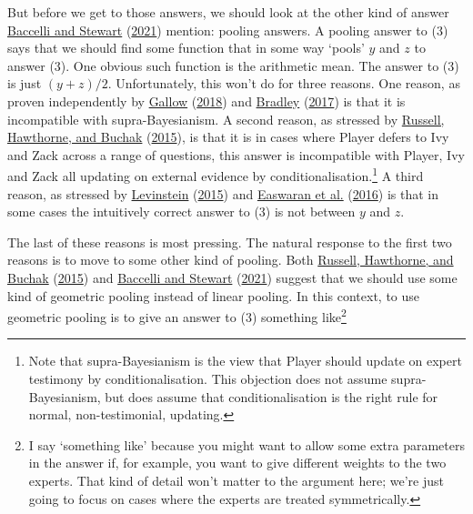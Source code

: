\documentclass[
  12pt,
]{article}
\begin{document}
But before we get to those answers, we should look at the other kind of
answer \protect\hyperlink{ref-BaccelliStewart2021}{Baccelli and Stewart}
(\protect\hyperlink{ref-BaccelliStewart2021}{2021}) mention: pooling
answers. A pooling answer to (3) says that we should find some function
that in some way `pools' \(y\) and \(z\) to answer (3). One obvious such
function is the arithmetic mean. The answer to (3) is just
\((y + z)/2\). Unfortunately, this won't do for three reasons. One
reason, as proven independently by
\protect\hyperlink{ref-Gallow2018}{Gallow}
(\protect\hyperlink{ref-Gallow2018}{2018}) and
\protect\hyperlink{ref-Bradley2017}{Bradley}
(\protect\hyperlink{ref-Bradley2017}{2017}) is that it is incompatible
with supra-Bayesianism. A second reason, as stressed by
\protect\hyperlink{ref-RussellEtAl2015}{Russell, Hawthorne, and Buchak}
(\protect\hyperlink{ref-RussellEtAl2015}{2015}), is that it is in cases
where Player defers to Ivy and Zack across a range of questions, this
answer is incompatible with Player, Ivy and Zack all updating on
external evidence by conditionalisation.\footnote{Note that
  supra-Bayesianism is the view that Player should update on expert
  testimony by conditionalisation. This objection does not assume
  supra-Bayesianism, but does assume that conditionalisation is the
  right rule for normal, non-testimonial, updating.} A third reason, as
stressed by \protect\hyperlink{ref-Levinstein2015}{Levinstein}
(\protect\hyperlink{ref-Levinstein2015}{2015}) and
\protect\hyperlink{ref-EaswaranEtAl2016}{Easwaran et al.}
(\protect\hyperlink{ref-EaswaranEtAl2016}{2016}) is that in some cases
the intuitively correct answer to (3) is not between \(y\) and \(z\).

The last of these reasons is most pressing. The natural response to the
first two reasons is to move to some other kind of pooling. Both
\protect\hyperlink{ref-RussellEtAl2015}{Russell, Hawthorne, and Buchak}
(\protect\hyperlink{ref-RussellEtAl2015}{2015}) and
\protect\hyperlink{ref-BaccelliStewart2021}{Baccelli and Stewart}
(\protect\hyperlink{ref-BaccelliStewart2021}{2021}) suggest that we
should use some kind of geometric pooling instead of linear pooling. In
this context, to use geometric pooling is to give an answer to (3)
something like\footnote{I say `something like' because you might want to
  allow some extra parameters in the answer if, for example, you want to
  give different weights to the two experts. That kind of detail won't
  matter to the argument here; we're just going to focus on cases where
  the experts are treated symmetrically.}
\end{document}
